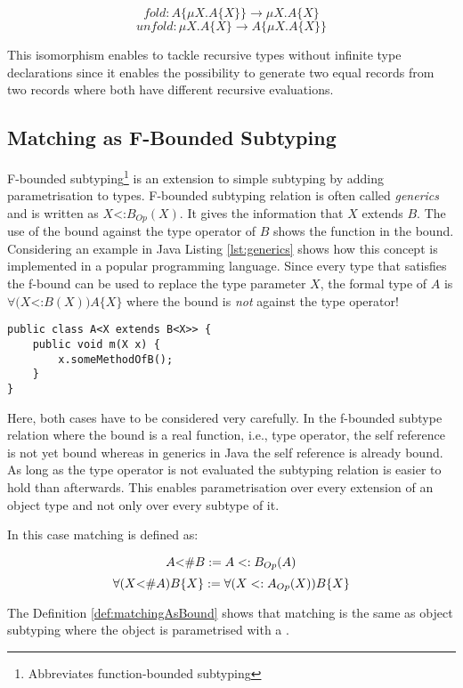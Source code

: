 \begin{defn}
	\label{def:foldUnfold}
	\[fold : A\{\mu X.A\{X\}\} \rightarrow \mu X.A\{X\}\]
	\[unfold : \mu X.A\{X\} \rightarrow A\{\mu X.A\{X\}\}\]
\end{defn}

This isomorphism enables to tackle recursive types without infinite type
declarations since it enables the possibility to generate two equal
records from two records where both have different recursive evaluations.

\subsection{Matching as F-Bounded Subtyping}
F-bounded subtyping\footnote{Abbreviates function-bounded subtyping}
is an extension to simple subtyping by adding parametrisation to
types. F-bounded subtyping relation is often called \emph{generics}
and is written as $X$<:$B_{Op}(X)$. It gives the information that $X$
extends $B$. The use of the bound against the type operator of $B$
shows the function in the bound. Considering an example in Java
Listing \ref{lst:generics} shows how this concept is implemented in a popular
programming language. Since every type that satisfies the f-bound can
be used to replace the type parameter $X$, the formal type of $A$ is
$\forall(X$<:$B(X))A\{X\}$ where the bound is \emph{not} against the
type operator!

\begin{lstlisting}[float=ht,caption={Universal quantified f-bound in Java.},label={lst:generics}]
public class A<X extends B<X>> {
	public void m(X x) {
		x.someMethodOfB();
	}
}
\end{lstlisting}

Here, both cases have to be considered very carefully. In the f-bounded
subtype relation where the bound is a real function, i.e., type operator,
the self reference is not yet bound whereas in generics in Java the self
reference is already bound. As long as the type operator is not evaluated
the subtyping relation is easier to hold than afterwards. This enables
parametrisation over every extension of an object type and not only over
every subtype of it.

In this case matching is defined as\cite{abadi_subtyping_1996}:

\begin{defn}
	\label{def:matchingAsBound}
	\[A \textnormal{<\#} B := A <: B_{Op}(A)\]
	\[\forall (X \textnormal{<\#} A)B\{X\} := \forall (X <: A_{Op}(X))B\{X\}\]
\end{defn}

The Definition \ref{def:matchingAsBound} shows that matching is the same
as object subtyping where the object is parametrised with a \mytype.
